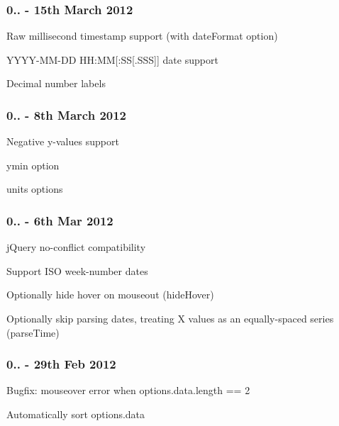 \subsubsection*{0.. -\/ 15th March 2012}


\begin{DoxyItemize}
\item Raw millisecond timestamp support (with {\ttfamily date\+Format} option)
\item Y\+Y\+Y\+Y-\/\+M\+M-\/\+DD HH\+:MM\mbox{[}\+:SS\mbox{[}.S\+SS\mbox{]}\mbox{]} date support
\item Decimal number labels
\end{DoxyItemize}

\subsubsection*{0.. -\/ 8th March 2012}


\begin{DoxyItemize}
\item Negative y-\/values support
\item {\ttfamily ymin} option
\item {\ttfamily units} options
\end{DoxyItemize}

\subsubsection*{0.. -\/ 6th Mar 2012}


\begin{DoxyItemize}
\item j\+Query no-\/conflict compatibility
\item Support I\+SO week-\/number dates
\item Optionally hide hover on mouseout ({\ttfamily hide\+Hover})
\item Optionally skip parsing dates, treating X values as an equally-\/spaced series ({\ttfamily parse\+Time})
\end{DoxyItemize}

\subsubsection*{0.. -\/ 29th Feb 2012}


\begin{DoxyItemize}
\item Bugfix\+: mouseover error when options.\+data.\+length == 2
\item Automatically sort options.\+data
\end{DoxyItemize}

